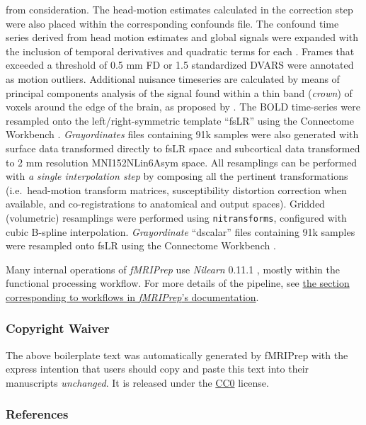 \documentclass[
]{article}
\begin{document}
\begin{description}
from consideration. The head-motion estimates calculated in the
correction step were also placed within the corresponding confounds
file. The confound time series derived from head motion estimates and
global signals were expanded with the inclusion of temporal derivatives
and quadratic terms for each \citep{confounds_satterthwaite_2013}.
Frames that exceeded a threshold of 0.5 mm FD or 1.5 standardized DVARS
were annotated as motion outliers. Additional nuisance timeseries are
calculated by means of principal components analysis of the signal found
within a thin band (\emph{crown}) of voxels around the edge of the
brain, as proposed by \citep{patriat_improved_2017}. The BOLD
time-series were resampled onto the left/right-symmetric template
``fsLR'' using the Connectome Workbench \citep{hcppipelines}.
\emph{Grayordinates} files \citep{hcppipelines} containing 91k samples
were also generated with surface data transformed directly to fsLR space
and subcortical data transformed to 2 mm resolution MNI152NLin6Asym
space. All resamplings can be performed with \emph{a single
interpolation step} by composing all the pertinent transformations
(i.e.~head-motion transform matrices, susceptibility distortion
correction when available, and co-registrations to anatomical and output
spaces). Gridded (volumetric) resamplings were performed using
\texttt{nitransforms}, configured with cubic B-spline interpolation.
\emph{Grayordinate} ``dscalar'' files containing 91k samples were
resampled onto fsLR using the Connectome Workbench \citep{hcppipelines}.
\end{description}

Many internal operations of \emph{fMRIPrep} use \emph{Nilearn} 0.11.1
\citep[RRID:SCR\_001362]{nilearn}, mostly within the functional
processing workflow. For more details of the pipeline, see
\href{https://fmriprep.readthedocs.io/en/latest/workflows.html}{the
section corresponding to workflows in \emph{fMRIPrep}'s documentation}.

\subsubsection{Copyright Waiver}\label{copyright-waiver}

The above boilerplate text was automatically generated by fMRIPrep with
the express intention that users should copy and paste this text into
their manuscripts \emph{unchanged}. It is released under the
\href{https://creativecommons.org/publicdomain/zero/1.0/}{CC0} license.

\subsubsection{References}\label{references}


\end{document}
